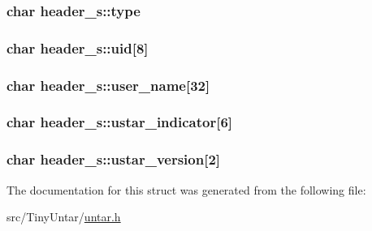 \subsubsection[{\texorpdfstring{type}{type}}]{\setlength{\rightskip}{0pt plus 5cm}char header\+\_\+s\+::type}\hypertarget{structheader__s_ac4ef9d8ca794a4f8fd27ebcb6f3f30cc}{}\label{structheader__s_ac4ef9d8ca794a4f8fd27ebcb6f3f30cc}
\subsubsection[{\texorpdfstring{uid}{uid}}]{\setlength{\rightskip}{0pt plus 5cm}char header\+\_\+s\+::uid\mbox{[}8\mbox{]}}\hypertarget{structheader__s_a3f40cec1739fa9b9f87257f70693b072}{}\label{structheader__s_a3f40cec1739fa9b9f87257f70693b072}
\subsubsection[{\texorpdfstring{user\+\_\+name}{user_name}}]{\setlength{\rightskip}{0pt plus 5cm}char header\+\_\+s\+::user\+\_\+name\mbox{[}32\mbox{]}}\hypertarget{structheader__s_a4c3170954261e29acd3af7efbe9070c6}{}\label{structheader__s_a4c3170954261e29acd3af7efbe9070c6}
\subsubsection[{\texorpdfstring{ustar\+\_\+indicator}{ustar_indicator}}]{\setlength{\rightskip}{0pt plus 5cm}char header\+\_\+s\+::ustar\+\_\+indicator\mbox{[}6\mbox{]}}\hypertarget{structheader__s_a02dbb164bc5f5b2ddb2ecd0a695ecea4}{}\label{structheader__s_a02dbb164bc5f5b2ddb2ecd0a695ecea4}
\subsubsection[{\texorpdfstring{ustar\+\_\+version}{ustar_version}}]{\setlength{\rightskip}{0pt plus 5cm}char header\+\_\+s\+::ustar\+\_\+version\mbox{[}2\mbox{]}}\hypertarget{structheader__s_a9ef115903a0ea3583f1993f6ab00113b}{}\label{structheader__s_a9ef115903a0ea3583f1993f6ab00113b}


The documentation for this struct was generated from the following file\+:\begin{DoxyCompactItemize}
\item 
src/\+Tiny\+Untar/\hyperlink{untar_8h}{untar.\+h}\end{DoxyCompactItemize}
